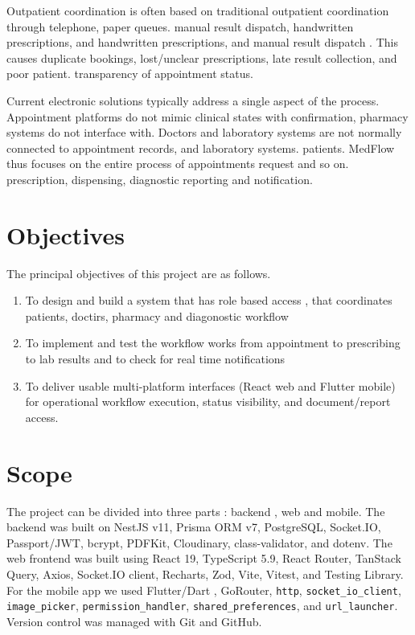 \documentclass[12pt,a4paper]{report}
\begin{document}
Outpatient coordination is often based on traditional outpatient coordination through telephone, paper queues.
manual result dispatch, handwritten prescriptions, and handwritten prescriptions, and manual result dispatch \cite{r4}. This causes duplicate
bookings, lost/unclear prescriptions, late result collection, and poor patient.
transparency of appointment status.

Current electronic solutions typically address a single aspect of the process. Appointment platforms
do not mimic clinical states with confirmation, pharmacy systems do not interface with.
Doctors and laboratory systems are not normally connected to appointment records, and laboratory systems.
patients. MedFlow thus focuses on the entire process of appointments request and so on.
prescription, dispensing, diagnostic reporting and notification.

\section{Objectives}

The principal objectives of this project are as follows.

\begin{enumerate}[label=\arabic*.,leftmargin=0.7in]
  \item To design and build a system that has role based access , that coordinates patients, doctirs, pharmacy and diagonostic workflow
  \item 
To implement and test the workflow works from appointment to prescribing to lab results and to check for real time notifications
  \item To deliver usable multi-platform interfaces (React web and Flutter mobile) for
        operational workflow execution, status visibility, and document/report access.
\end{enumerate}

\section{Scope}

The project can be divided into three parts : backend , web and mobile. 
The backend was built on NestJS v11, Prisma ORM v7, PostgreSQL, Socket.IO, Passport/JWT, bcrypt, PDFKit,
Cloudinary, class-validator, and dotenv.
The web frontend was built using React 19, TypeScript 5.9,
React Router, TanStack Query, Axios, Socket.IO client, Recharts, Zod, Vite, Vitest, and
Testing Library. For the mobile app we used Flutter/Dart , GoRouter, \texttt{http},
\texttt{socket\_io\_client}, \texttt{image\_picker}, \texttt{permission\_handler},
\texttt{shared\_preferences}, and \texttt{url\_launcher}. Version control was managed
with Git and GitHub.
\end{document}
